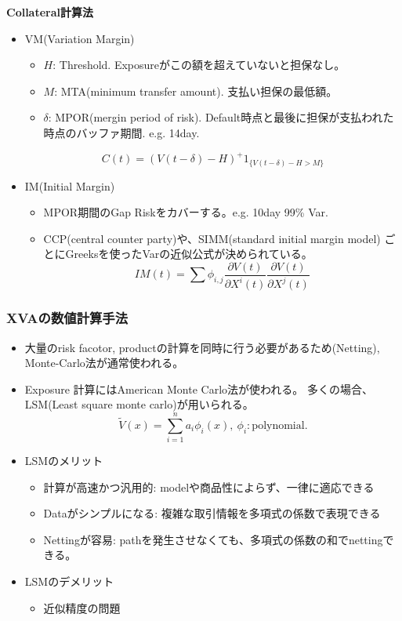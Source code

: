 \documentclass[driverfallback=dvipdfmx,cjk]{beamer}
\begin{document}
\begin{frame}
    \textbf{Collateral計算法}
    \begin{itemize}
        \item VM(Variation Margin)
            \begin{itemize}
                \item $H$: Threshold. Exposureがこの額を超えていないと担保なし。
                \item $M$: MTA(minimum transfer amount). 支払い担保の最低額。
                \item $\delta$: MPOR(mergin period of risk). Default時点と最後に担保が支払われた時点のバッファ期間. e.g. 14day.
            \end{itemize}
            $$ C(t) = \left(V(t- \delta) - H\right)^+ 1_{\{V(t-\delta)-H > M\}}$$
        \item IM(Initial Margin)
            \begin{itemize}
                \item MPOR期間のGap Riskをカバーする。e.g. 10day 99\% Var.
                \item CCP(central counter party)や、SIMM(standard initial margin model)
                    ごとにGreeksを使ったVarの近似公式が決められている。
                    $$IM(t) = \sum \phi_{i,j} \frac{\partial V(t)}{\partial X^i(t)} \frac{\partial V(t)}{\partial X^j(t)}$$
            \end{itemize}
    \end{itemize}
\end{frame}

\begin{frame} \frametitle{XVAの数値計算手法}
    \begin{itemize}
        \item 大量のrisk facotor, productの計算を同時に行う必要があるため(Netting), Monte-Carlo法が通常使われる。
        \item Exposure 計算にはAmerican Monte Carlo法が使われる。
            多くの場合、LSM(Least square monte carlo)が用いられる。
            $$ \tilde{V}(x) = \sum_{i=1}^n a_i \phi_i(x), \ \phi_i: \text{polynomial}.$$
        \item LSMのメリット
        \begin{itemize}
            \item 計算が高速かつ汎用的: modelや商品性によらず、一律に適応できる
            \item Dataがシンプルになる: 複雑な取引情報を多項式の係数で表現できる
            \item Nettingが容易: pathを発生させなくても、多項式の係数の和でnettingできる。
        \end{itemize}
    \item LSMのデメリット
        \begin{itemize}
            \item 近似精度の問題
        \end{itemize}
    \end{itemize}
\end{frame}
\end{document}
